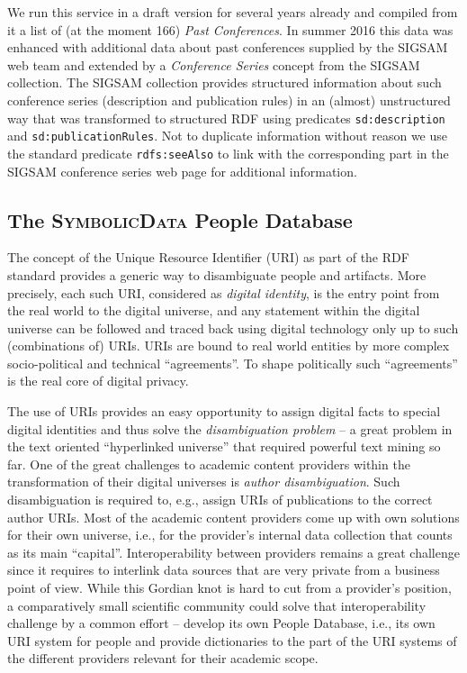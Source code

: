 \documentclass[a4paper,11pt]{article}
\def\SD{\textsc{SymbolicData}}
\begin{document}
We run this service in a draft version  for several years already and compiled
from it a list of (at the moment 166) \emph{Past Conferences}. In summer 2016
this data was enhanced with additional data about past conferences supplied by
the SIGSAM web team and extended by a \emph{Conference Series} concept from the
SIGSAM collection.  The SIGSAM collection provides structured information about
such conference series (description and publication rules) in an (almost)
unstructured way that was transformed to structured RDF using predicates
\texttt{sd:description} and \texttt{sd:publicationRules}.  Not to duplicate
information without reason we use the standard predicate \texttt{rdfs:seeAlso}
to link with the corresponding part in the SIGSAM conference series web page
for additional information.

\subsection{The {\SD} People Database}

The concept of the Unique Resource Identifier (URI) as part of the RDF standard
provides a generic way to disambiguate people and artifacts.  More precisely,
each such URI, considered as \emph{digital identity}, is the entry point from the
real world to the digital universe, and any statement within the digital
universe can be followed and traced back using digital technology only up to
such (combinations of) URIs. URIs are bound to real world entities by more
complex socio-political and technical ``agreements''. To shape politically such
``agreements'' is the real core of digital privacy.

The use of URIs provides an easy opportunity to assign digital facts to special
digital identities and thus solve the \emph{disambiguation problem} -- a great
problem in the text oriented ``hyperlinked universe'' that required powerful
text mining so far.  One of the great challenges to academic content providers
within the transformation of their digital universes is \emph{author
  disambiguation}. Such disambiguation is required to, e.g., assign URIs of
publications to the correct author URIs.  Most of the academic content
providers come up with own solutions for their own universe, i.e., for the
provider's internal data collection that counts as its main ``capital''.
Interoperability between providers remains a great challenge since it requires
to interlink data sources that are very private from a business point of view.
While this Gordian knot is hard to cut from a provider's position, a
comparatively small scientific community could solve that interoperability
challenge by a common effort -- develop its own People Database, i.e., its own
URI system for people and provide dictionaries to the part of the URI systems
of the different providers relevant for their academic scope.
\end{document}
